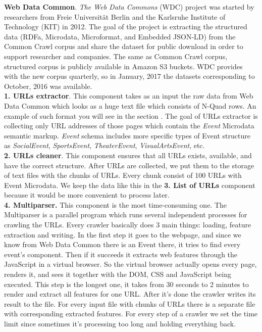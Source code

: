 \textbf{Web Data Common}. \textit{The Web Data Commons} (WDC) project was started by researchers from Freie Universität Berlin and the Karlsruhe Institute of Technology (KIT) in 2012. The goal of the project is extracting the structured data (RDFa, Microdata, Microformat, and Embedded JSON-LD) from the Common Crawl corpus and share the dataset for public download in order to support researcher and companies. The same as Common Crawl corpus, structured corpus is publicly available in Amazon S3 buckets. WDC provides with the new corpus quarterly, so in January, 2017 the datasets corresponding to October, 2016 was available.\\

\textbf{1. URLs extractor}. This component takes as an input the raw data from Web Data Common which looks as a huge text file which consists of N-Quad rows. An example of such format you will see in the section . The goal of URLs extractor is collecting only URL addresses of those pages which contain the \textit{Event} Microdata semantic markup. \textit{Event} schema includes more specific types of Event structure as \textit{SocialEvent}, \textit{SportsEvent}, \textit{TheaterEvent}, \textit{VisualArtsEvent}, etc.\\

\textbf{2. URLs cleaner}. This component ensures that all URLs exists, available, and have the correct structure. After URLs are collected, we put them to the storage of text files with the chunks of URLs. Every chunk consist of 100 URLs with Event Microdata. We keep the data like this in the \textbf{3. List of URLs} component because it would be more convenient to process later.\\

\textbf{4. Multiparser.} This component is the most time-consuming one. The Multiparser is a parallel program which runs several independent processes for crawling the URLs. Every crawler basically does 3 main things: loading, feature extraction and writing. In the first step it goes to the webpage, and since we know from Web Data Common there is an Event there, it tries to find every event's component. Then if it succeeds it extracts web features through the JavaScript in a virtual browser. So the virtual browser actually opens every page, renders it, and sees it together with the DOM, CSS and JavaScript being executed. This step is the longest one, it takes from 30 seconds to 2 minutes to render and extract all features for one URL. After it's done the crawler writes its result to the file. For every input file with chunks of URLs there is a separate file with corresponding extracted features. For every step of a crawler we set the time limit since sometimes it's processing too long and holding everything back. \\


